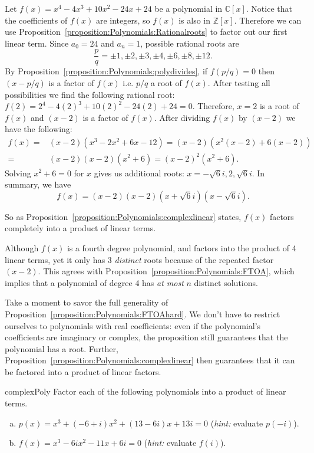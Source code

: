 \begin{example}{}
Let $f(x)=x^4-4x^3+10x^2-24x+24$ be a polynomial in $\mathbb{C}[x]$. Notice that the coefficients of $f(x)$ are integers, so $f(x)$ is also in $\mathbb{Z}[x]$. Therefore we can use Proposition~\ref{proposition:Polynomials:Rationalroots} to factor out our first linear term. Since $a_0=24$ and $a_n=1$, possible rational roots are 
$$\frac{p}{q}= \pm1, \pm 2, \pm 3, \pm 4,\pm 6, \pm 8, \pm 12.$$ 
By Proposition~\ref{proposition:Polynomials:polydivides}, if $f(p/q)=0$ then $(x-p/q)$ is a factor of $f(x)$ i.e. $p/q$ a root of $f(x)$. After testing all possibilities we find the following rational root:
$f(2)=2^4-4(2)^3+10(2)^2-24(2)+24=0$. Therefore, $x=2$ is a root of $f(x)$ and $(x-2)$ is a factor of $f(x)$. After dividing $f(x)$ by $(x-2)$ we have the following: 
\begin{align*}
f(x)=& (x-2)(x^3-2x^2+6x-12)=(x-2)(x^2(x-2)+6(x-2))\\
=&(x-2)(x-2)(x^2+6)=(x-2)^2(x^2+6). 
\end{align*}
Solving $x^2+6=0$  for $x$ gives us additional roots: $x = -\sqrt6 i, 2,\sqrt6 i$. In summary, we have
$$f(x)= (x-2)(x-2)(x+\sqrt{6}i)(x-\sqrt{6}i).$$ 

So as Proposition~\ref{proposition:Polynomials:complexlinear} states, $f(x)$  factors completely into a product of  linear terms. 
\end{example}

\begin{rem}
Although $f(x)$ is a fourth degree polynomial, and factors into the product of 4 linear terms, yet it only has 3 \emph{distinct} roots because of the repeated factor $(x-2)$. This agrees with  Proposition~\ref{proposition:Polynomials:FTOA}, which implies that a polynomial of degree 4 has \emph{at most} $n$ distinct solutions.  
\end{rem}

Take a moment to savor the full generality of Proposition~\ref{proposition:Polynomials:FTOAhard}. We don't have to restrict ourselves to polynomials with real coefficients: even if the polynomial's coefficients are imaginary or complex, the proposition still guarantees that the polynomial has a root. Further, Proposition~\ref{proposition:Polynomials:complexlinear} then guarantees that it can be factored into a product of linear factors.

\begin{exercise}{complexPoly}
Factor each of the following polynomials into a product of linear terms.
\begin{enumerate}[(a)]
\item
$p(x) = x^3 + (-6+i)x^2 + (13-6i)x + 13i = 0$  (\emph{hint:} evaluate $p(-i)$).
\item
$f(x) = x^3 - 6ix^2 -11x + 6i = 0$ (\emph{hint:} evaluate $f(i)$).
\end{enumerate}
\end{exercise}

